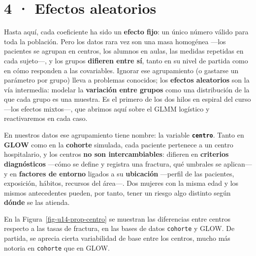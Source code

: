 \documentclass[
  letterpaper,
  DIV=11,
  numbers=noendperiod]{scrartcl}
\begin{document}
\hypertarget{sec-u14}{%
\section{4 · Efectos aleatorios}\label{sec-u14}}

Hasta aquí, cada coeficiente ha sido un \textbf{efecto fijo}: un único
número válido para toda la población. Pero los datos rara vez son una
masa homogénea ---los pacientes se agrupan en centros, los alumnos en
aulas, las medidas repetidas en cada sujeto---, y los grupos
\textbf{difieren entre sí}, tanto en su nivel de partida como en cómo
responden a las covariables. Ignorar ese agrupamiento (o gastarse un
parámetro por grupo) lleva a problemas conocidos; los \textbf{efectos
aleatorios} son la vía intermedia: modelar la \textbf{variación entre
grupos} como una distribución de la que cada grupo es una muestra. Es el
primero de los dos hilos en espiral del curso ---los efectos mixtos---,
que abrimos aquí sobre el GLMM logístico y reactivaremos en cada caso.

En nuestros datos ese agrupamiento tiene nombre: la variable
\textbf{\texttt{centro}}. Tanto en \textbf{GLOW} como en la
\textbf{cohorte} simulada, cada paciente pertenece a un centro
hospitalario, y los centros \textbf{no son intercambiables}: difieren en
\textbf{criterios diagnósticos} ---cómo se define y registra una
fractura, qué umbrales se aplican--- y en \textbf{factores de entorno}
ligados a su \textbf{ubicación} ---perfil de las pacientes, exposición,
hábitos, recursos del área---. Dos mujeres con la misma edad y los
mismos antecedentes pueden, por tanto, tener un riesgo algo distinto
según \textbf{dónde} se las atienda.

En la Figura~\ref{fig-u14-prop-centro} se muestran las diferencias entre
centros respecto a las tasas de fractura, en las bases de datos
\texttt{cohorte} y GLOW. De partida, se aprecia cierta variabilidad de
base entre los centros, mucho más notoria en \texttt{cohorte} que en
GLOW.
\end{document}
